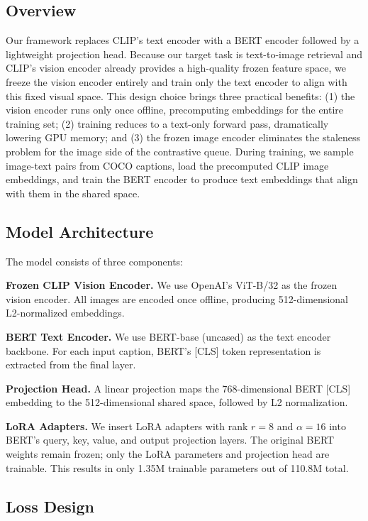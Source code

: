 \documentclass[10pt,leqno]{amsart}
\begin{document}
\subsection{Overview}

Our framework replaces CLIP's text encoder with a BERT encoder followed by a lightweight projection head. Because our target task is text-to-image retrieval and CLIP's vision encoder already provides a high-quality frozen feature space, we freeze the vision encoder entirely and train only the text encoder to align with this fixed visual space. This design choice brings three practical benefits: (1) the vision encoder runs only once offline, precomputing embeddings for the entire training set; (2) training reduces to a text-only forward pass, dramatically lowering GPU memory; and (3) the frozen image encoder eliminates the staleness problem for the image side of the contrastive queue. During training, we sample image-text pairs from COCO captions, load the precomputed CLIP image embeddings, and train the BERT encoder to produce text embeddings that align with them in the shared space.

\subsection{Model Architecture}

The model consists of three components:

\textbf{Frozen CLIP Vision Encoder.} We use OpenAI's ViT-B/32 as the frozen vision encoder. All images are encoded once offline, producing 512-dimensional L2-normalized embeddings.

\textbf{BERT Text Encoder.} We use BERT-base (uncased) as the text encoder backbone. For each input caption, BERT's [CLS] token representation is extracted from the final layer.

\textbf{Projection Head.} A linear projection maps the 768-dimensional BERT [CLS] embedding to the 512-dimensional shared space, followed by L2 normalization.

\textbf{LoRA Adapters.} We insert LoRA \citep{hu2022lora} adapters with rank $r=8$ and $\alpha=16$ into BERT's query, key, value, and output projection layers. The original BERT weights remain frozen; only the LoRA parameters and projection head are trainable. This results in only 1.35M trainable parameters out of 110.8M total.

\subsection{Loss Design}
\end{document}

